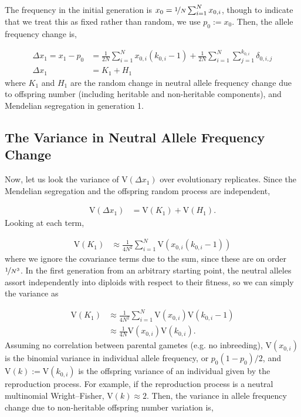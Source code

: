 \documentclass[11pt]{article}
\newcommand{\V}{\text{V}}
\begin{document}
The frequency in the initial generation is $x_0 = \nicefrac{1}{N} \sum_{i=1}^N
x_{0,i}$, though to indicate that we treat this as fixed rather than random, we
use $p_0 := x_0$. Then, the allele frequency change is,

\begin{align}
  \Delta x_1 = x_1 - p_0 &= \frac{1}{2N} \sum_{i=1}^N x_{0,i} (k_{0,i} - 1) + \frac{1}{2N} \sum_{i=1}^N \sum_{j=1}^{k_{0,i}} \delta_{0,i,j} \nonumber \\
  \Delta x_1 &= K_1 + H_1
\end{align}
%
where $K_1$ and $H_1$ are the random change in neutral allele frequency change
due to offspring number (including heritable and non-heritable components), and
Mendelian segregation in generation 1.

\subsection{The Variance in Neutral Allele Frequency Change}

Now, let us look the variance of $\V(\Delta x_1)$ over evolutionary
replicates. Since the Mendelian segregation and the offspring random process
are independent,

\begin{align}
  \V(\Delta x_1) &= \V(K_1) + \V(H_1).
\end{align}
%
Looking at each term,

\begin{align}
  \V(K_1) &\approx \frac{1}{4N^2} \sum_{i=1}^N \V\left(x_{0,i} (k_{0,i} - 1) \right)
\end{align}
%
where we ignore the covariance terms due to the sum, since these are on order
$\nicefrac{1}{N^3}$. In the first generation from an arbitrary starting point,
the neutral alleles assort independently into diploids with respect to their
fitness, so we can simply the variance as

\begin{align}
  \V(K_1) &\approx \frac{1}{4N^2} \sum_{i=1}^N \V(x_{0,i}) \V(k_{0,i} - 1) \nonumber  \\
            &\approx \frac{1}{4N} \V(x_{0,i}) \V(k_{0,i}).
\end{align}
%
Assuming no correlation between parental gametes (e.g. no inbreeding),
$\V(x_{0,i})$ is the binomial variance in individual allele frequency, or
$p_0(1-p_0)/2$, and $\V(k) := \V(k_{0,i})$ is the offspring variance of an
individual given by the reproduction process. For example, if the reproduction
process is a neutral multinomial Wright--Fisher, $\V(k) \approx 2$. Then, the
variance in allele frequency change due to non-heritable offspring number
variation is,
\end{document}
